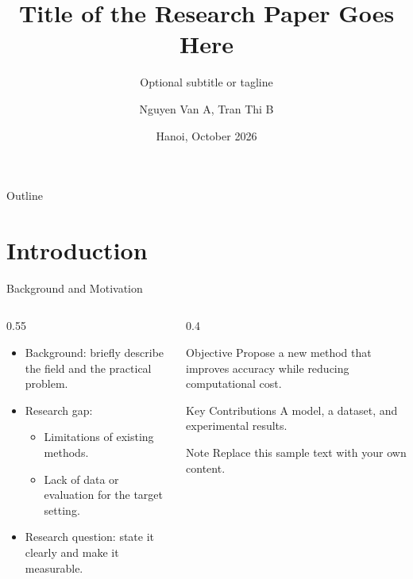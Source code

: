 \documentclass[aspectratio=169, 11pt, t]{beamer}
\title[Short Research Title]{Title of the Research Paper Goes Here}
\subtitle{Optional subtitle or tagline}
\author[N. V. A, T. T. B]{Nguyen Van A, Tran Thi B}
\institute{SICT, Hanoi University of Industry}
\date{Hanoi, October 2026}
\begin{document}
\begin{frame}[plain]
  \titlepage
\end{frame}

\begin{frame}{Outline}
  \hauisidephoto
  \tableofcontents[hideallsubsections]
\end{frame}

\section{Introduction}

\begin{frame}{Background and Motivation}
  \begin{columns}[T]
    \begin{column}{0.55\textwidth}
      \begin{itemize}
        \item Background: briefly describe the field and the practical problem.
        \item Research gap:
          \begin{itemize}
            \item Limitations of existing methods.
            \item Lack of data or evaluation for the target setting.
          \end{itemize}
        \item \alert{Research question}: state it clearly and make it measurable.
      \end{itemize}
    \end{column}
    \begin{column}{0.4\textwidth}
      \begin{block}{Objective}
        Propose a new method that improves accuracy while reducing computational cost.
      \end{block}
      \begin{exampleblock}{Key Contributions}
        A model, a dataset, and experimental results.
      \end{exampleblock}
      \begin{alertblock}{Note}
        Replace this sample text with your own content.
      \end{alertblock}
    \end{column}
  \end{columns}
\end{frame}
\end{document}
